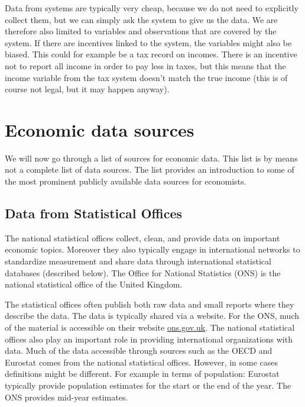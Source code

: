 \documentclass[
]{book}
\begin{document}
Data from systems are typically very cheap, because we do not need to explicitly collect them, but we can simply ask the system to give us the data. We are therefore also limited to variables and observations that are covered by the system. If there are incentives linked to the system, the variables might also be biased. This could for example be a tax record on incomes. There is an incentive not to report all income in order to pay less in taxes, but this means that the income variable from the tax system doesn't match the true income (this is of course not legal, but it may happen anyway).

\hypertarget{economic-data-sources}{%
\section{Economic data sources}\label{economic-data-sources}}

We will now go through a list of sources for economic data. This list is by means not a complete list of data sources. The list provides an introduction to some of the most prominent publicly available data sources for economists.

\hypertarget{data-from-statistical-offices}{%
\subsection*{Data from Statistical Offices}\label{data-from-statistical-offices}}

The national statistical offices collect, clean, and provide data on important economic topics. Moreover they also typically engage in international networks to standardize measurement and share data through international statistical databases (described below). The Office for National Statistics (ONS) is the national statistical office of the United Kingdom.

The statistical offices often publish both raw data and small reports where they describe the data. The data is typically shared via a website. For the ONS, much of the material is accessible on their website \href{https://www.ons.gov.uk/}{ons.gov.uk}. The national statistical offices also play an important role in providing international organizations with data. Much of the data accessible through sources such as the OECD and Eurostat comes from the national statistical offices. However, in some cases definitions might be different. For example in terms of population: Eurostat typically provide population estimates for the start or the end of the year. The ONS provides mid-year estimates.
\end{document}
